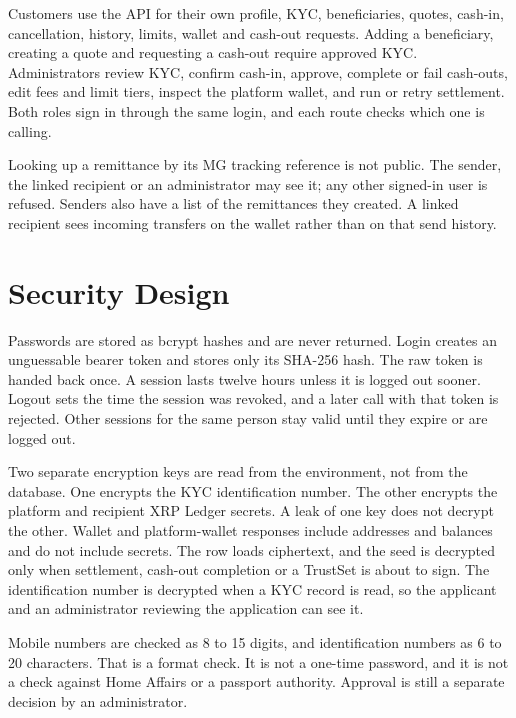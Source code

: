 \documentclass[11pt,a4paper]{article}
\begin{document}
Customers use the API for their own profile, KYC, beneficiaries, quotes, cash-in, cancellation, history, limits, wallet and cash-out requests. Adding a beneficiary, creating a quote and requesting a cash-out require approved KYC. Administrators review KYC, confirm cash-in, approve, complete or fail cash-outs, edit fees and limit tiers, inspect the platform wallet, and run or retry settlement. Both roles sign in through the same login, and each route checks which one is calling.

Looking up a remittance by its MG tracking reference is not public. The sender, the linked recipient or an administrator may see it; any other signed-in user is refused. Senders also have a list of the remittances they created. A linked recipient sees incoming transfers on the wallet rather than on that send history.

\section{Security Design}\label{sec:security}

Passwords are stored as bcrypt hashes and are never returned. Login creates an unguessable bearer token and stores only its SHA-256 hash. The raw token is handed back once. A session lasts twelve hours unless it is logged out sooner. Logout sets the time the session was revoked, and a later call with that token is rejected. Other sessions for the same person stay valid until they expire or are logged out.

Two separate encryption keys are read from the environment, not from the database. One encrypts the KYC identification number. The other encrypts the platform and recipient XRP Ledger secrets. A leak of one key does not decrypt the other. Wallet and platform-wallet responses include addresses and balances and do not include secrets. The row loads ciphertext, and the seed is decrypted only when settlement, cash-out completion or a TrustSet is about to sign. The identification number is decrypted when a KYC record is read, so the applicant and an administrator reviewing the application can see it.

Mobile numbers are checked as 8 to 15 digits, and identification numbers as 6 to 20 characters. That is a format check. It is not a one-time password, and it is not a check against Home Affairs or a passport authority. Approval is still a separate decision by an administrator.
\end{document}
